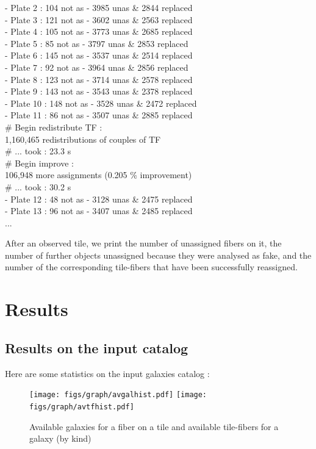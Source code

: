 \documentclass{article}
\begin{document}
{ - Plate 2 :   104 not as -  3985 unas \& 2844 replaced \\
 - Plate 3 :   121 not as -  3602 unas \& 2563 replaced \\
 - Plate 4 :   105 not as -  3773 unas \& 2685 replaced \\
 - Plate 5 :    85 not as -  3797 unas \& 2853 replaced \\
 - Plate 6 :   145 not as -  3537 unas \& 2514 replaced \\
 - Plate 7 :    92 not as -  3964 unas \& 2856 replaced \\
 - Plate 8 :   123 not as -  3714 unas \& 2578 replaced \\
- Plate 9 :   143 not as -  3543 unas \& 2378 replaced \\
- Plate 10 :   148 not as -  3528 unas \& 2472 replaced \\
- Plate 11 :    86 not as -  3507 unas \& 2885 replaced \\
\# Begin redistribute TF : \\
  1,160,465 redistributions of couples of TF \\
\# ... took : 23.3 s \\
\# Begin improve : \\
  106,948 more assignments (0.205 \% improvement) \\
\# ... took : 30.2 s \\
- Plate 12 :   48 not as -  3128 unas \& 2475 replaced \\
- Plate 13 :    96 not as -  3407 unas \& 2485 replaced \\
...\\
}

After an observed tile, we print the number of unassigned fibers on it, the number of further objects unassigned because they were analysed as fake, and the number of the corresponding tile-fibers that have been successfully reassigned.

\section{Results}
\subsection{Results on the input catalog}
Here are some statistics on the input galaxies catalog :

\begin{figure}[H]\begin{center}
	\texttt{[image: figs/graph/avgalhist.pdf]}
	\texttt{[image: figs/graph/avtfhist.pdf]}\hfill
	\caption{Available galaxies for a fiber on a tile and available tile-fibers for a galaxy (by kind)}\label{avtfhist}
\end{center}\end{figure}
\end{document}
